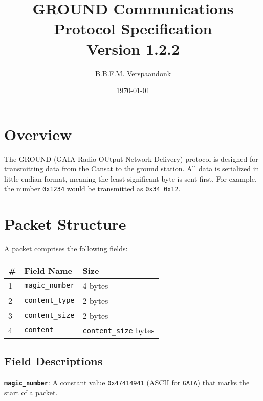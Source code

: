 \documentclass[a4paper]{article}
\title{GROUND Communications Protocol Specification\\ \large Version 1.2.2}
\date{\today}
\author{B.B.F.M. Verspaandonk}
\begin{document}
\maketitle

\tableofcontents

\section{Overview}
The GROUND (GAIA Radio OUtput Network Delivery) protocol is designed for transmitting data from the Cansat to the ground station. All data is serialized in little-endian format, meaning the least significant byte is sent first. For example, the number \texttt{0x1234} would be transmitted as \texttt{0x34 0x12}.

\section{Packet Structure}
A packet comprises the following fields:
\begin{longtable}{@{}lll@{}}
\toprule
\# & Field Name         & Size                \\
\midrule
1  & \texttt{magic\_number}      & 4 bytes             \\
2  & \texttt{content\_type} & 2 bytes             \\
3  & \texttt{content\_size} & 2 bytes             \\
4  & \texttt{content}     & \texttt{content\_size} bytes \\
\bottomrule
\end{longtable}

\subsection{Field Descriptions}
\textbf{\texttt{magic\_number}}: A constant value \texttt{0x47414941} (ASCII for \texttt{GAIA}) that marks the start of a packet.
\end{document}

